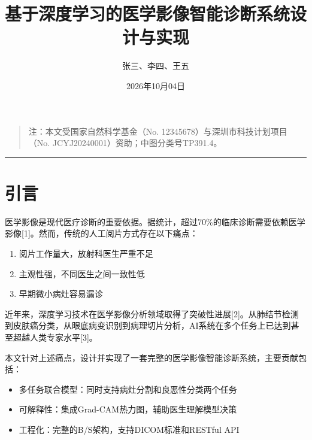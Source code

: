 \documentclass{harryopo-book}
\title{基于深度学习的医学影像智能诊断系统设计与实现}
\author{张三、李四、王五}
\institute{示例大学 计算机学院；南方科技大学 计算机科学与工程系}
\date{2026年10月04日}
\begin{document}
\frontmatter
\maketitle


\tableofcontents
\mainmatter

\begin{quote}
注：本文受国家自然科学基金（No. 12345678）与深圳市科技计划项目（No. JCYJ20240001）资助；中图分类号TP391.4。
\end{quote}

\medskip\hrule\medskip

\section{引言}

医学影像是现代医疗诊断的重要依据。据统计，超过70\%的临床诊断需要依赖医学影像[1]。然而，传统的人工阅片方式存在以下痛点：

\begin{enumerate}
  \item 阅片工作量大，放射科医生严重不足
  \item 主观性强，不同医生之间一致性低
  \item 早期微小病灶容易漏诊
\end{enumerate}

近年来，深度学习技术在医学影像分析领域取得了突破性进展[2]。从肺结节检测到皮肤癌分类，从眼底病变识别到病理切片分析，AI系统在多个任务上已达到甚至超越人类专家水平[3]。

本文针对上述痛点，设计并实现了一套完整的医学影像智能诊断系统，主要贡献包括：

\begin{itemize}
  \item {\fzht 多任务联合模型}：同时支持病灶分割和良恶性分类两个任务
  \item {\fzht 可解释性}：集成Grad-CAM热力图，辅助医生理解模型决策
  \item {\fzht 工程化}：完整的B/S架构，支持DICOM标准和RESTful API
\end{itemize}
\end{document}

